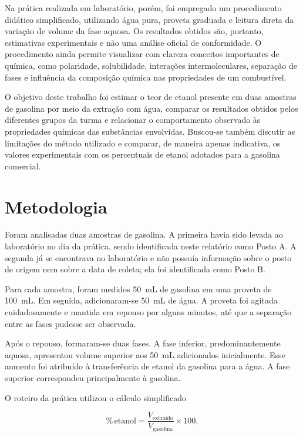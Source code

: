 \documentclass[11pt]{ifscarticle}
\begin{document}
Na prática realizada em laboratório, porém, foi empregado um procedimento didático simplificado, utilizando água pura, proveta graduada e leitura direta da variação de volume da fase aquosa. Os resultados obtidos são, portanto, estimativas experimentais e não uma análise oficial de conformidade. O procedimento ainda permite visualizar com clareza conceitos importantes de química, como polaridade, solubilidade, interações intermoleculares, separação de fases e influência da composição química nas propriedades de um combustível.

O objetivo deste trabalho foi estimar o teor de etanol presente em duas amostras de gasolina por meio da extração com água, comparar os resultados obtidos pelos diferentes grupos da turma e relacionar o comportamento observado às propriedades químicas das substâncias envolvidas. Buscou-se também discutir as limitações do método utilizado e comparar, de maneira apenas indicativa, os valores experimentais com os percentuais de etanol adotados para a gasolina comercial.

\section{Metodologia}

Foram analisadas duas amostras de gasolina. A primeira havia sido levada ao laboratório no dia da prática, sendo identificada neste relatório como Posto A. A segunda já se encontrava no laboratório e não possuía informação sobre o posto de origem nem sobre a data de coleta; ela foi identificada como Posto B.

Para cada amostra, foram medidos \SI{50}{\milli\liter} de gasolina em uma proveta de \SI{100}{\milli\liter}. Em seguida, adicionaram-se \SI{50}{\milli\liter} de água. A proveta foi agitada cuidadosamente e mantida em repouso por alguns minutos, até que a separação entre as fases pudesse ser observada.

Após o repouso, formaram-se duas fases. A fase inferior, predominantemente aquosa, apresentou volume superior aos \SI{50}{\milli\liter} adicionados inicialmente. Esse aumento foi atribuído à transferência de etanol da gasolina para a água. A fase superior correspondeu principalmente à gasolina.

O roteiro da prática utilizou o cálculo simplificado

\begin{equation}
\%\,\text{etanol} =
\frac{V_{\text{extraído}}}{V_{\text{gasolina}}}\times 100,
\end{equation}
\end{document}
